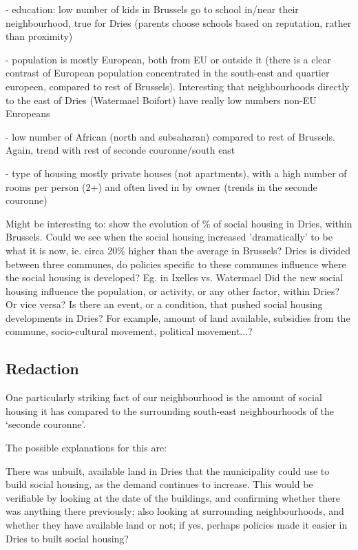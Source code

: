 \documentclass{article}
\begin{document}
- education: low number of kids in Brussels go to school in/near their neighbourhood, true for Dries (parents choose schools based on reputation, rather than proximity)

- population is mostly European, both from EU or outside it (there is a clear contrast of European population concentrated in the south-east and quartier europeen, compared to rest of Brussels). Interesting that neighbourhoods directly to the east of Dries (Watermael Boifort) have really low numbers non-EU Europeans

- low number of African (north and subsaharan) compared to rest of Brussels. Again, trend with rest of seconde couronne/south east 

- type of housing mostly private houses (not apartments), with a high number of rooms per person (2+) and often lived in by owner (trends in the seconde couronne)

\begin{outline}
	\1 Might be interesting to: show the evolution of \% of social housing in Dries, within Brussels. Could we see when the social housing increased 'dramatically' to be what it is now, ie. circa 20\% higher than the average in Brussels?
	\1 Dries is divided between three communes, do policies specific to these communes influence where the social housing is developed? Eg. in Ixelles vs. Watermael
	\1 Did the new social housing influence the population, or activity, or any other factor, within Dries? Or vice versa?
	\1 Is there an event, or a condition, that pushed social housing developments in Dries? For example, amount of land available, subsidies from the commune, socio-cultural movement, political movement...?
\end{outline}
 

\subsection{Redaction}

One particularly striking fact of our neighbourhood is the amount of social housing it has compared to the surrounding south-east neighbourhoods of the `seconde couronne'. 

The possible explanations for this are:

\begin{outline}
	\1 There was unbuilt, available land in Dries that the municipality could use to build social housing, as the demand continues to increase. This would be verifiable by looking at the date of the buildings, and confirming whether there was anything there previously; also looking at surrounding neighbourhoods, and whether they have available land or not; if yes, perhaps policies made it easier in Dries to built social housing?
	\1
\end{outline}
\end{document}
